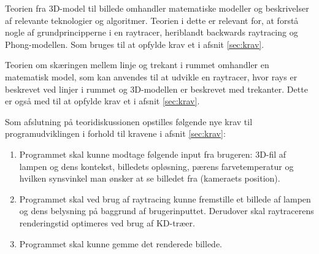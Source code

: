 Teorien fra 3D-model til billede omhandler matematiske modeller og beskrivelser af relevante teknologier og algoritmer. Teorien i dette er relevant for, at forstå nogle af grundprincipperne i en raytracer, heriblandt backwards raytracing og Phong-modellen. Som bruges til at opfylde krav et i afsnit \ref{sec:krav}.

Teorien om skæringen mellem linje og trekant i rummet omhandler en matematisk model, som kan anvendes til at udvikle en raytracer, hvor rays er beskrevet ved linjer i rummet og 3D-modellen er beskrevet med trekanter. Dette er også med til at opfylde krav et i afsnit \ref{sec:krav}.

Som afslutning på teoridiskussionen opstilles følgende nye krav til programudviklingen i forhold til kravene i afsnit \ref{sec:krav}:
\begin{enumerate}
    \item Programmet skal kunne modtage følgende input fra brugeren: 3D-fil af lampen og dens kontekst, billedets opløsning, pærens farvetemperatur og hvilken synsvinkel man ønsker at se billedet fra (kameraets position).
    \item Programmet skal ved brug af raytracing kunne fremstille et billede af lampen og dens belysning på baggrund af brugerinputtet. Derudover skal raytracerens renderingstid optimeres ved brug af KD-træer.
    \item Programmet skal kunne gemme det renderede billede.
\end{enumerate}